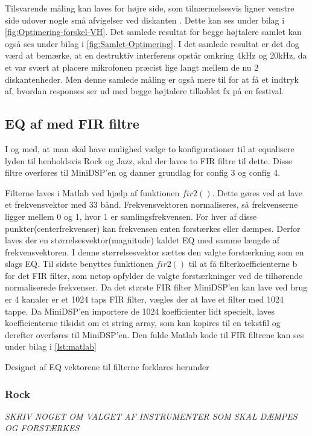 Tilsvarende måling kan laves for højre side, som tilnærmelsesvis ligner venstre side udover nogle små afvigelser ved diskanten . Dette kan ses under bilag i \autoref{fig:Optimering-forskel-VH}. Det samlede resultat for begge højtalere samlet kan også ses under bilag i \autoref{fig:Samlet-Optimering}. I det samlede resultat er det dog værd at bemærke, at en destruktiv interferens opstår omkring 4kHz og 20kHz, da et var svært at placere mikrofonen præcist lige langt mellem de nu 2 diskantenheder. Men denne samlede måling er også mere til for at få et indtryk af, hvordan responses ser ud med begge højtalere tilkoblet fx på en festival.

\subsection{EQ af med FIR filtre}
I og med, at man skal have mulighed vælge to konfigurationer til at equalisere lyden til henholdsvis Rock og Jazz, skal der laves to FIR filtre til dette. Disse filtre overføres til MiniDSP'en og danner grundlag for config 3 og config 4.

Filterne laves i Matlab ved hjælp af funktionen $fir2()$. Dette gøres ved at lave et frekvensvektor med 33 bånd. Frekvensvektoren normaliseres, så frekvenserne ligger mellem 0 og 1, hvor 1 er samlingsfrekvensen. For hver af disse punkter(centerfrekvenser) kan frekvensen enten forstærkes eller dæmpes. Derfor laves der en størrelsesvektor(magnitude) kaldet EQ med samme længde af frekvensvektoren. I denne størrelsesvektor sættes den valgte forstærkning som en slags EQ. Til sidste benyttes funktionen $fir2()$ til at få filterkoefficienterne b for det FIR filter, som netop opfylder de valgte forstærkninger ved de tilhørende normaliserede frekvenser. Da det største FIR filter MiniDSP'en kan lave ved brug er 4 kanaler er et 1024 taps FIR filter, vægles der at lave et filter med 1024 tappe. Da MiniDSP'en importere de 1024 koefficienter lidt specielt, laves koefficienterne tilsidst om et string array, som kan kopires til en tekstfil og derefter overføres til MiniDSP'en. Den fulde Matlab kode til FIR filtrene kan ses under bilag i \autoref{lst:matlab}
  

Designet af EQ vektorene til filterne forklares herunder


\subsubsection{Rock}
\textit{SKRIV NOGET OM VALGET AF INSTRUMENTER SOM SKAL DÆMPES OG FORSTÆRKES}


